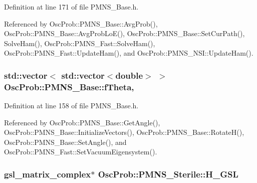 Definition at line 171 of file P\+M\+N\+S\+\_\+\+Base.\+h.



Referenced by Osc\+Prob\+::\+P\+M\+N\+S\+\_\+\+Base\+::\+Avg\+Prob(), Osc\+Prob\+::\+P\+M\+N\+S\+\_\+\+Base\+::\+Avg\+Prob\+Lo\+E(), Osc\+Prob\+::\+P\+M\+N\+S\+\_\+\+Base\+::\+Set\+Cur\+Path(), Solve\+Ham(), Osc\+Prob\+::\+P\+M\+N\+S\+\_\+\+Fast\+::\+Solve\+Ham(), Osc\+Prob\+::\+P\+M\+N\+S\+\_\+\+Fast\+::\+Update\+Ham(), and Osc\+Prob\+::\+P\+M\+N\+S\+\_\+\+N\+S\+I\+::\+Update\+Ham().

\subsubsection[{\texorpdfstring{f\+Theta}{fTheta}}]{\setlength{\rightskip}{0pt plus 5cm}std\+::vector$<$ std\+::vector$<$double$>$ $>$ Osc\+Prob\+::\+P\+M\+N\+S\+\_\+\+Base\+::f\+Theta\hspace{0.3cm}{\ttfamily [protected]}, {\ttfamily [inherited]}}\hypertarget{classOscProb_1_1PMNS__Base_a1976887cd658dd86b2336c181f1470b4}{}\label{classOscProb_1_1PMNS__Base_a1976887cd658dd86b2336c181f1470b4}


Definition at line 158 of file P\+M\+N\+S\+\_\+\+Base.\+h.



Referenced by Osc\+Prob\+::\+P\+M\+N\+S\+\_\+\+Base\+::\+Get\+Angle(), Osc\+Prob\+::\+P\+M\+N\+S\+\_\+\+Base\+::\+Initialize\+Vectors(), Osc\+Prob\+::\+P\+M\+N\+S\+\_\+\+Base\+::\+Rotate\+H(), Osc\+Prob\+::\+P\+M\+N\+S\+\_\+\+Base\+::\+Set\+Angle(), and Osc\+Prob\+::\+P\+M\+N\+S\+\_\+\+Fast\+::\+Set\+Vacuum\+Eigensystem().

\subsubsection[{\texorpdfstring{H\+\_\+\+G\+SL}{H_GSL}}]{\setlength{\rightskip}{0pt plus 5cm}gsl\+\_\+matrix\+\_\+complex$\ast$ Osc\+Prob\+::\+P\+M\+N\+S\+\_\+\+Sterile\+::\+H\+\_\+\+G\+SL\hspace{0.3cm}{\ttfamily [protected]}}\hypertarget{classOscProb_1_1PMNS__Sterile_aeff790051925a3135b7529ced67e81ab}{}\label{classOscProb_1_1PMNS__Sterile_aeff790051925a3135b7529ced67e81ab}


